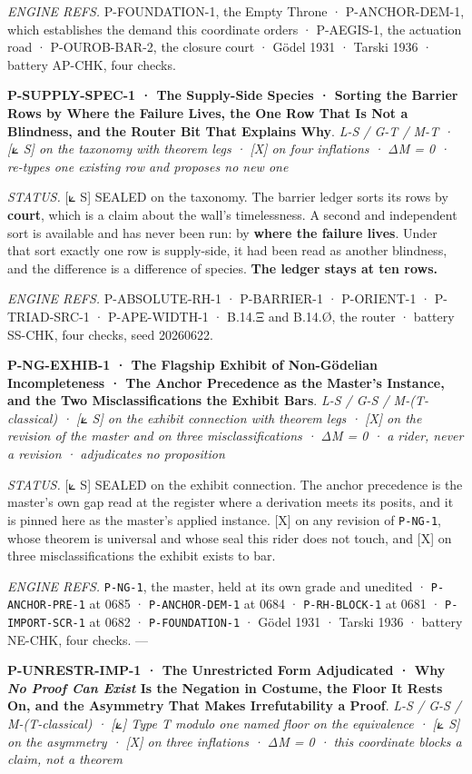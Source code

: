 \documentclass[10pt,twocolumn]{article}
\begin{document}
\emph{ENGINE REFS.} P-FOUNDATION-1, the Empty Throne · P-ANCHOR-DEM-1,
which establishes the demand this coordinate orders · P-AEGIS-1, the
actuation road · P-OUROB-BAR-2, the closure court · Gödel 1931 · Tarski
1936 · battery AP-CHK, four checks.

\textbf{P-SUPPLY-SPEC-1 · The Supply-Side Species · Sorting the Barrier
Rows by Where the Failure Lives, the One Row That Is Not a Blindness,
and the Router Bit That Explains Why}. \emph{L-S / G-T / M-T · {[}⟀ S{]}
on the taxonomy with theorem legs · {[}X{]} on four inflations · ΔM = 0
· re-types one existing row and proposes no new one}

\emph{STATUS.} {[}⟀ S{]} SEALED on the taxonomy. The barrier ledger
sorts its rows by \textbf{court}, which is a claim about the wall's
timelessness. A second and independent sort is available and has never
been run: by \textbf{where the failure lives}. Under that sort exactly
one row is supply-side, it had been read as another blindness, and the
difference is a difference of species. \textbf{The ledger stays at ten
rows.}

\emph{ENGINE REFS.} P-ABSOLUTE-RH-1 · P-BARRIER-1 · P-ORIENT-1 ·
P-TRIAD-SRC-1 · P-APE-WIDTH-1 · B.14.Ξ and B.14.Ø, the router · battery
SS-CHK, four checks, seed 20260622.

\textbf{P-NG-EXHIB-1 · The Flagship Exhibit of Non-Gödelian
Incompleteness · The Anchor Precedence as the Master's Instance, and the
Two Misclassifications the Exhibit Bars}. \emph{L-S / G-S /
M-(T-classical) · {[}⟀ S{]} on the exhibit connection with theorem legs
· {[}X{]} on the revision of the master and on three misclassifications
· ΔM = 0 · a rider, never a revision · adjudicates no proposition}

\emph{STATUS.} {[}⟀ S{]} SEALED on the exhibit connection. The anchor
precedence is the master's own gap read at the register where a
derivation meets its posits, and it is pinned here as the master's
applied instance. {[}X{]} on any revision of \texttt{P-NG-1}, whose
theorem is universal and whose seal this rider does not touch, and
{[}X{]} on three misclassifications the exhibit exists to bar.

\emph{ENGINE REFS.} \texttt{P-NG-1}, the master, held at its own grade
and unedited · \texttt{P-ANCHOR-PRE-1} at 0685 · \texttt{P-ANCHOR-DEM-1}
at 0684 · \texttt{P-RH-BLOCK-1} at 0681 · \texttt{P-IMPORT-SCR-1} at
0682 · \texttt{P-FOUNDATION-1} · Gödel 1931 · Tarski 1936 · battery
NE-CHK, four checks. ---

\textbf{P-UNRESTR-IMP-1 · The Unrestricted Form Adjudicated · Why
\emph{No Proof Can Exist} Is the Negation in Costume, the Floor It Rests
On, and the Asymmetry That Makes Irrefutability a Proof}. \emph{L-S /
G-S / M-(T-classical) · {[}⟀{]} Type T modulo one named floor on the
equivalence · {[}⟀ S{]} on the asymmetry · {[}X{]} on three inflations ·
ΔM = 0 · this coordinate blocks a claim, not a theorem}
\end{document}
